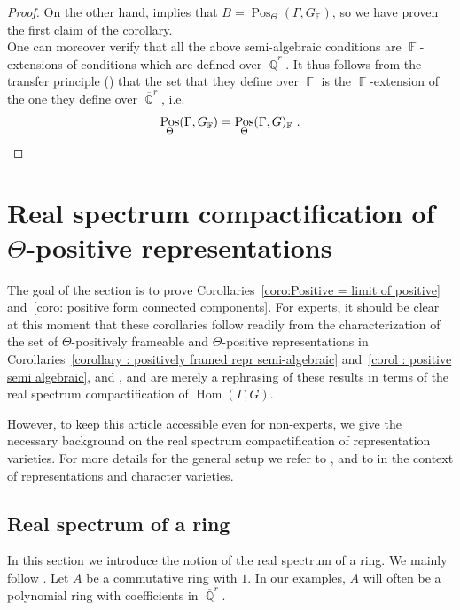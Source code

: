 \documentclass{amsart}
\theoremstyle{plain}
\theoremstyle{definition}
\DeclareMathOperator{\Hom}{Hom}
\DeclareMathOperator{\Pos}{Pos}
\DeclareMathOperator{\Fb}{{\mathbb{F}}}
\DeclareMathOperator{\Qb}{\mathbb{Q}}
\newcommand{\Qbar}{\overline{\Qb}^r}
\newcommand{\1}{\mathbf{1}}
\begin{document}
\begin{proof}
On the other hand,  implies that $B=\Pos_\Theta(\Gamma, G_{\Fb})$, so we have proven the first claim of the corollary. \\

One can moreover verify that all the above semi-algebraic conditions are $\Fb$-extensions of conditions which are defined over $\Qbar$. It thus follows from the transfer principle () that the set that they define over $\Fb$ is the $\Fb$-extension of the one they define over $\Qbar$, i.e.\
\[\Pos_\Theta(\Gamma,G_{\Fb})= \Pos_\Theta(\Gamma,G)_{\Fb}~.\qedhere\]
\end{proof}


\section{%
\texorpdfstring{%
Real spectrum compactification of $\Theta$-positive representations}%
{Real spectrum compactification of Theta-positive representations}}
\label{section:RSC}

The goal of the section is to prove Corollaries~\ref{coro:Positive = limit of positive} and~\ref{coro: positive form connected components}.
For experts, it should be clear at this moment that these corollaries follow readily from the characterization of the set of $\Theta$-positively frameable and $\Theta$-positive representations in Corollaries~\ref{corollary : positively framed repr semi-algebraic} and~\ref{corol : positive semi algebraic}, and , and are merely a rephrasing of these results in terms of the real spectrum compactification of $\Hom(\Gamma,G)$.

However, to keep this article accessible even for non-experts, we give the necessary background on the real spectrum compactification of representation varieties.
For more details for the general setup we refer to \cite{BochnakCosteRoy_RealAlgebraicGeometry, Scheiderer_RAG}, and to \cite{BurgerIozziParreauPozzetti_RSCCharacterVarieties2} in the context of representations and character varieties.

\subsection{Real spectrum of a ring}

In this section we introduce the notion of the real spectrum of a ring.
We mainly follow \cite[Chapters 7.1 and 7.2]{BochnakCosteRoy_RealAlgebraicGeometry}.
Let $A$ be a commutative ring with $1$.
In our examples, $A$ will often be a polynomial ring with coefficients in $\overline{\Qb}^r$.
\end{document}

